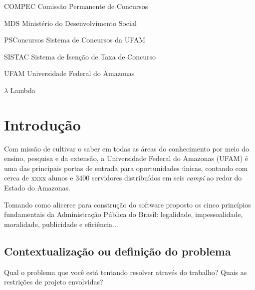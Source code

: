 \documentclass[
	12pt,			%
	openright,		%
	oneside,	
	a4paper,		%
	english,		%
	brazil			%
]{abntex2/abntex2}  %
\begin{document}
\listoffigures*
\cleardoublepage

\listoftables*
\cleardoublepage

\begin{siglas}
  \item[COMPEC] Comissão Permanente de Concursos
  \item[MDS] Ministério do Desenvolvimento Social
  \item[PSConcursos] Sistema de Concursos da UFAM
  \item[SISTAC] Sistema de Isenção de Taxa de Concurso
  \item[UFAM] Universidade Federal do Amazonas
\end{siglas}

\begin{simbolos}
  \item[$ \lambda $] Lambda
\end{simbolos}

\tableofcontents*
\cleardoublepage

\textual

\chapter{Introdução}

	Com missão de cultivar o saber em todas as áreas do conhecimento por meio do ensino, pesquisa e da extensão, a Universidade Federal do Amazonas (UFAM) é uma das principais
	portas de entrada para oportunidades únicas, contando com cerca de xxxx alunos e 3400 servidores distribuídos em seis \textit{campi} ao redor do Estado do Amazonas.
	
	
	
	Tomando como alicerce para construção do software proposto os cinco princípios fundamentais da Administração Pública do Brasil: legalidade, impessoalidade, moralidade, publicidade e eficiência...
	

	\section{Contextualização ou definição do problema}
	
		Qual o problema que você está tentando resolver através do trabalho? Quais
		as restrições de projeto envolvidas?
\end{document}
